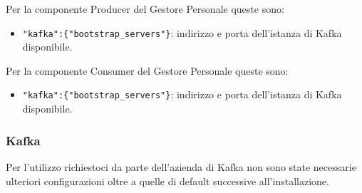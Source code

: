 	Per la componente Producer del Gestore Personale queste sono:
	\begin{itemize}
		\item\texttt{"kafka":\{"bootstrap\_servers"\}}: indirizzo e porta dell'istanza di Kafka disponibile.
	\end{itemize}

	Per la componente Consumer del Gestore Personale queste sono:
	\begin{itemize}
		\item\texttt{"kafka":\{"bootstrap\_servers"\}}: indirizzo e porta dell'istanza di Kafka disponibile.
	\end{itemize}


	\subsubsection{Kafka}
	Per l'utilizzo richiestoci da parte dell'azienda di Kafka non sono state necessarie ulteriori configurazioni oltre a quelle di default successive all'installazione.
